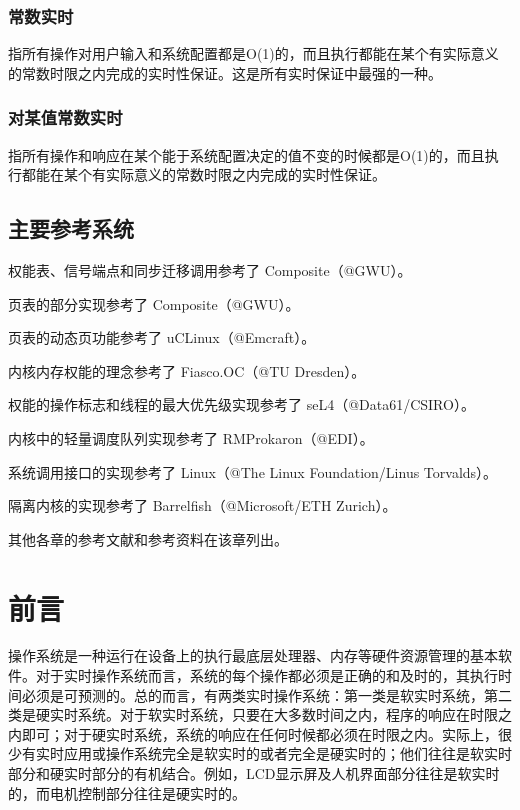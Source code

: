\subsubsection{常数实时}\label{subsubsec:1-constant-real-time}

指所有操作对用户输入和系统配置都是O(1)的，而且执行都能在某个有实际意义的常数时限之内完成的实时性保证。这是所有实时保证中最强的一种。

\subsubsection{对某值常数实时}\label{subsubsec:1-value-constant-real-time}

指所有操作和响应在某个能于系统配置决定的值不变的时候都是O(1)的，而且执行都能在某个有实际意义的常数时限之内完成的实时性保证。

\subsection{主要参考系统}\label{subsec:1-major-reference-systems}

权能表、信号端点和同步迁移调用参考了 Composite（@GWU）。

页表的部分实现参考了 Composite（@GWU）。

页表的动态页功能参考了 uCLinux（@Emcraft）。

内核内存权能的理念参考了 Fiasco.OC（@TU Dresden）。

权能的操作标志和线程的最大优先级实现参考了 seL4（@Data61/CSIRO）。

内核中的轻量调度队列实现参考了 RMProkaron（@EDI）。

系统调用接口的实现参考了 Linux（@The Linux Foundation/Linus Torvalds）。

隔离内核的实现参考了 Barrelfish（@Microsoft/ETH Zurich）。

其他各章的参考文献和参考资料在该章列出。

\section{前言}\label{sec:1-foreword}

操作系统是一种运行在设备上的执行最底层处理器、内存等硬件资源管理的基本软件。对于实时操作系统而言，系统的每个操作都必须是正确的和及时的，其执行时间必须是可预测的。总的而言，有两类实时操作系统：第一类是软实时系统，第二类是硬实时系统。对于软实时系统，只要在大多数时间之内，程序的响应在时限之内即可；对于硬实时系统，系统的响应在任何时候都必须在时限之内。实际上，很少有实时应用或操作系统完全是软实时的或者完全是硬实时的；他们往往是软实时部分和硬实时部分的有机结合。例如，LCD显示屏及人机界面部分往往是软实时的，而电机控制部分往往是硬实时的。

